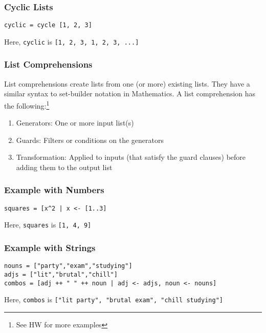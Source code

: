 \documentclass{article}
\begin{document}
\subsubsection*{Cyclic Lists}
\begin{verbatim}
cyclic = cycle [1, 2, 3]
\end{verbatim}
Here, \texttt{cyclic} is \texttt{[1, 2, 3, 1, 2, 3, ...]}





\subsubsection{List Comprehensions} List comprehensions create lists
from one (or more) existing lists. They have a similar syntax to
set-builder notation in Mathematics. A list comprehension has the
following:\footnote{See HW for more examples}
\begin{enumerate}[label=(\roman*),align=left]
\item Generators: One or more input list(s)
\item Guards: Filters or conditions on the generators
\item Transformation: Applied to inputs (that satisfy the guard
  clauses) before adding them to the output list
\end{enumerate}

\subsubsection*{Example with Numbers}
\begin{verbatim}
squares = [x^2 | x <- [1..3]
\end{verbatim}
Here, \texttt{squares} is \texttt{[1, 4, 9]}

\subsubsection*{Example with Strings}
\begin{verbatim}
nouns = ["party","exam","studying"]
adjs = ["lit","brutal","chill"]
combos = [adj ++ " " ++ noun | adj <- adjs, noun <- nouns]
\end{verbatim}
Here, \texttt{combos} is \texttt{["lit party", "brutal exam", "chill studying"]}
\end{document}
